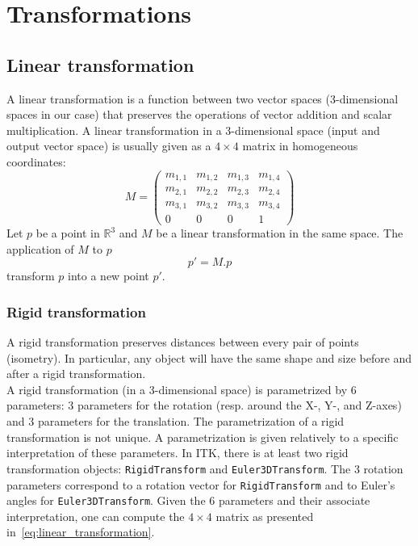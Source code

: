\chapter{Transformations}
\label{chap:transformations}


\section{Linear transformation}


A linear transformation is a function between two vector spaces (3-dimensional spaces in our case) that preserves the operations of vector addition and scalar multiplication. A linear transformation in a 3-dimensional space (input and output vector space) is usually given as a $4\times4$ matrix in homogeneous coordinates:
%
\begin{equation}
M =
\begin{pmatrix}
 m_{1,1} & m_{1,2} & m_{1,3} & m_{1,4} \\
 m_{2,1} & m_{2,2} & m_{2,3} & m_{2,4} \\
 m_{3,1} & m_{3,2} & m_{3,3} & m_{3,4} \\
 0 & 0 & 0 & 1
\end{pmatrix}
\label{eq:linear_transformation}
\end{equation}
%
Let $p$ be a point in $\mathds{R}^3$ and $M$ be a linear transformation in the same space. The application of $M$ to $p$
%
\begin{equation}
p' = M.p
\end{equation}
%
transform $p$ into a new point $p'$.


\subsection{Rigid transformation}

A rigid transformation preserves distances between every pair of points (isometry). In particular, any object will have the same shape and size before and after a rigid transformation.
\\
A rigid transformation (in a 3-dimensional space) is parametrized by 6 parameters: 3 parameters for the rotation (resp. around the X-, Y-, and Z-axes) and 3 parameters for the translation. The parametrization of a rigid transformation is not unique. A parametrization is given relatively to a specific interpretation of these parameters. In ITK, there is at least two rigid transformation objects: \texttt{RigidTransform} and \texttt{Euler3DTransform}. The 3 rotation parameters correspond to a rotation vector for \texttt{RigidTransform} and to Euler's angles for \texttt{Euler3DTransform}. Given the 6 parameters and their associate interpretation, one can compute the $4\times4$ matrix as presented in~\ref{eq:linear_transformation}.


